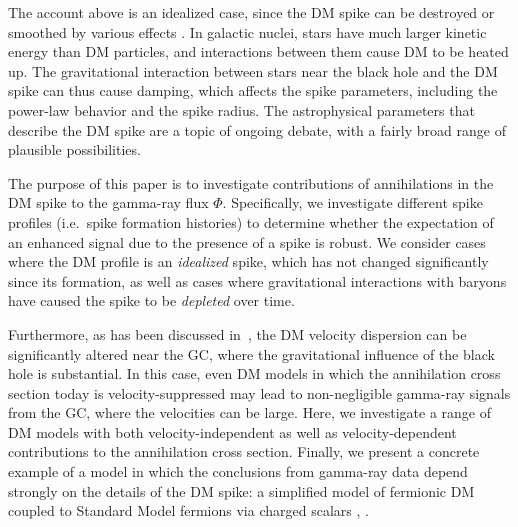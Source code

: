 \documentclass[11pt]{article}
\begin{document}
The account above is an idealized case, since the DM spike can be destroyed or smoothed by various effects \cite{Ullio:2001fb,Merritt:2003qk, Bertone:2005hw,Gnedin:2003rj, Ahn:2007ty}. In galactic nuclei, stars have much larger kinetic energy than DM particles, and interactions between them cause DM to be heated up. The gravitational interaction between stars near the black hole and the DM spike can thus cause damping, which affects the spike parameters, including the power-law behavior and the spike radius. The astrophysical parameters that describe the DM spike are a topic of ongoing debate, with a fairly broad range of plausible possibilities.

The purpose of this paper is to investigate contributions of annihilations in the DM spike to the gamma-ray flux $\Phi$.  Specifically, we investigate different spike profiles (i.e.~spike formation histories) to determine whether the expectation of an enhanced signal due to the presence of a spike is robust.  We consider cases where the DM profile is an {\it idealized} spike, which has not changed significantly since its formation, as well as cases where gravitational interactions with baryons have caused the spike to be {\it depleted} over time. %

Furthermore, as has been discussed in~\cite{Amin:2007ir,Shelton:2015aqa}, the DM velocity dispersion can be significantly altered near the GC, where the gravitational influence of the black hole is substantial.  In this case, even DM models in which the annihilation cross section today is velocity-suppressed may lead to non-negligible gamma-ray signals from the GC, where the velocities can be large.  Here, we investigate a range of DM models with both velocity-independent as well as velocity-dependent contributions to the annihilation cross section.  Finally, we present a concrete example of a model in which the conclusions from gamma-ray data depend strongly on the details of the DM spike: a simplified model of fermionic DM coupled to Standard Model fermions via charged scalars \cite{Sandick:2016zut}, \cite{Kumar:2016cum}.  
\end{document}
